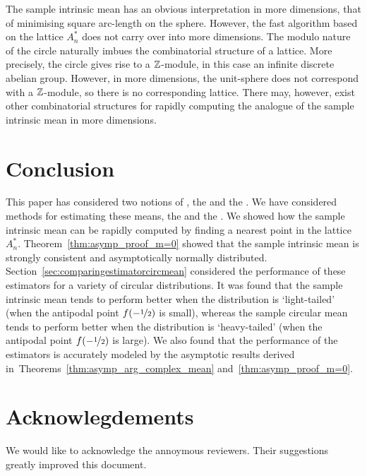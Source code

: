 \documentclass[journal]{IEEEtran}
\begin{document}
The sample intrinsic mean has an obvious interpretation in more dimensions, that of minimising square arc-length on the sphere. However, the fast algorithm based on the lattice $A_n^*$ does not carry over into more dimensions. The modulo nature of the circle naturally imbues the combinatorial structure of a lattice. More precisely, the circle gives rise to a ${\mathbb Z}$-module, in this case an infinite discrete abelian group. However, in more dimensions, the unit-sphere does not correspond with a ${\mathbb Z}$-module, so there is no corresponding lattice. There may, however, exist other combinatorial structures for rapidly computing the analogue of the sample intrinsic mean in more dimensions.

\section{Conclusion}

This paper has considered two notions of , the  and the . We have considered methods for estimating these means, the  and the .  We showed how the sample intrinsic mean can be rapidly computed by finding a nearest point in the lattice $A_n^*$. Theorem~\ref{thm:asymp_proof_m=0} showed that the sample intrinsic mean is strongly consistent and asymptotically normally distributed. Section~\ref{sec:comparingestimatorcircmean} considered the performance of these estimators for a variety of circular distributions.  It was found that the sample intrinsic mean tends to perform better when the distribution is `light-tailed' (when the antipodal point $f(-\nicefrac{1}{2})$ is small), whereas the sample circular mean tends to perform better when the distribution is `heavy-tailed' (when the antipodal point $f(-\nicefrac{1}{2})$ is large). We also found that the performance of the estimators is accurately modeled by the asymptotic results derived in~Theorems~\ref{thm:asymp_arg_complex_mean} and~\ref{thm:asymp_proof_m=0}.


\section{Acknowlegdements}
We would like to acknowledge the annoymous reviewers.  Their suggestions greatly improved this document.

\appendix
\end{document}
